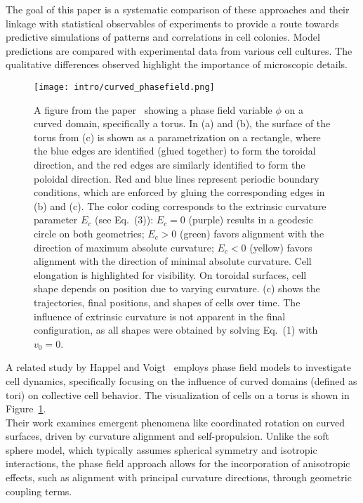 The goal of this paper is a systematic comparison of these approaches and their linkage with statistical observables of experiments to provide a route towards predictive simulations of patterns and correlations in cell colonies. 
Model predictions are compared with experimental data from various cell cultures. 
The qualitative differences observed highlight the importance of microscopic details. \\ 
\begin{figure}[h!]
	\centering
	\texttt{[image: intro/curved\_phasefield.png]}
	\caption{A figure from the paper~\cite{Happel2023} showing a phase field variable $\phi$ on a curved domain, specifically a torus. 
	In (a) and (b), the surface of the torus from (c) is shown as a parametrization on a rectangle, where the blue edges are identified (glued together) to form the toroidal direction, and the red edges are similarly identified to form the poloidal direction. 
	Red and blue lines represent periodic boundary conditions, which are enforced by gluing the corresponding edges in (b) and (c).
	The color coding corresponds to the extrinsic curvature parameter $E_c$ (see Eq.~(3)): $E_c = 0$ (purple) results in a geodesic circle on both geometries; $E_c > 0$ (green) favors alignment with the direction of maximum absolute curvature; $E_c < 0$ (yellow) favors alignment with the direction of minimal absolute curvature. 
	Cell elongation is highlighted for visibility. 
	On toroidal surfaces, cell shape depends on position due to varying curvature. 
	(c) shows the trajectories, final positions, and shapes of cells over time. 
	The influence of extrinsic curvature is not apparent in the final configuration, as all shapes were obtained by solving Eq.~(1) with $v_0 = 0$. 
	}
	\label{fig:curved_phasefield}
\end{figure}
A related study by Happel and Voigt~\cite{Happel2023} employs phase field models to investigate cell dynamics, specifically focusing on the influence of curved domains (defined as tori) on collective cell behavior. 
The visualization of cells on a torus is shown in Figure~\ref{fig:curved_phasefield}. \\ 
Their work examines emergent phenomena like coordinated rotation on curved surfaces, driven by curvature alignment and self-propulsion. 
Unlike the soft sphere model, which typically assumes spherical symmetry and isotropic interactions, the phase field approach allows for the incorporation of anisotropic effects, such as alignment with principal curvature directions, through geometric coupling terms. 
